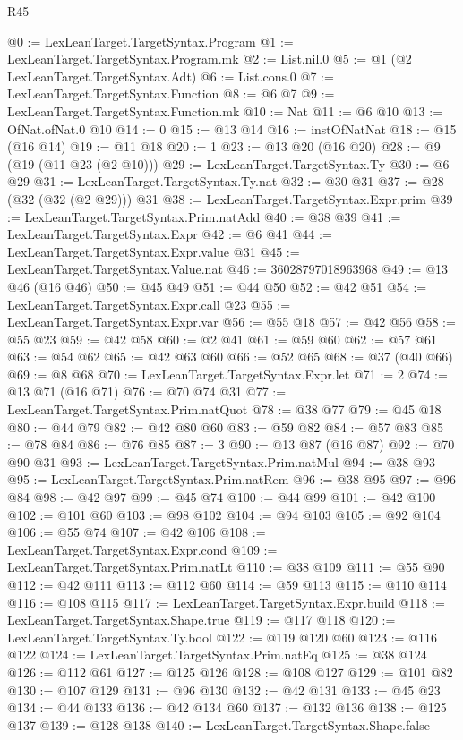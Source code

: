 \begin{lexlean}{R45}
\begin{coremodule}
@0 := LexLeanTarget.TargetSyntax.Program
@1 := LexLeanTarget.TargetSyntax.Program.mk
@2 := List.nil.{0}
@5 := @1 (@2 LexLeanTarget.TargetSyntax.Adt)
@6 := List.cons.{0}
@7 := LexLeanTarget.TargetSyntax.Function
@8 := @6 @7
@9 := LexLeanTarget.TargetSyntax.Function.mk
@10 := Nat
@11 := @6 @10
@13 := OfNat.ofNat.{0} @10
@14 := 0
@15 := @13 @14
@16 := instOfNatNat
@18 := @15 (@16 @14)
@19 := @11 @18
@20 := 1
@23 := @13 @20 (@16 @20)
@28 := @9 (@19 (@11 @23 (@2 @10)))
@29 := LexLeanTarget.TargetSyntax.Ty
@30 := @6 @29
@31 := LexLeanTarget.TargetSyntax.Ty.nat
@32 := @30 @31
@37 := @28 (@32 (@32 (@2 @29))) @31
@38 := LexLeanTarget.TargetSyntax.Expr.prim
@39 := LexLeanTarget.TargetSyntax.Prim.natAdd
@40 := @38 @39
@41 := LexLeanTarget.TargetSyntax.Expr
@42 := @6 @41
@44 := LexLeanTarget.TargetSyntax.Expr.value @31
@45 := LexLeanTarget.TargetSyntax.Value.nat
@46 := 36028797018963968
@49 := @13 @46 (@16 @46)
@50 := @45 @49
@51 := @44 @50
@52 := @42 @51
@54 := LexLeanTarget.TargetSyntax.Expr.call @23
@55 := LexLeanTarget.TargetSyntax.Expr.var
@56 := @55 @18
@57 := @42 @56
@58 := @55 @23
@59 := @42 @58
@60 := @2 @41
@61 := @59 @60
@62 := @57 @61
@63 := @54 @62
@65 := @42 @63 @60
@66 := @52 @65
@68 := @37 (@40 @66)
@69 := @8 @68
@70 := LexLeanTarget.TargetSyntax.Expr.let
@71 := 2
@74 := @13 @71 (@16 @71)
@76 := @70 @74 @31
@77 := LexLeanTarget.TargetSyntax.Prim.natQuot
@78 := @38 @77
@79 := @45 @18
@80 := @44 @79
@82 := @42 @80 @60
@83 := @59 @82
@84 := @57 @83
@85 := @78 @84
@86 := @76 @85
@87 := 3
@90 := @13 @87 (@16 @87)
@92 := @70 @90 @31
@93 := LexLeanTarget.TargetSyntax.Prim.natMul
@94 := @38 @93
@95 := LexLeanTarget.TargetSyntax.Prim.natRem
@96 := @38 @95
@97 := @96 @84
@98 := @42 @97
@99 := @45 @74
@100 := @44 @99
@101 := @42 @100
@102 := @101 @60
@103 := @98 @102
@104 := @94 @103
@105 := @92 @104
@106 := @55 @74
@107 := @42 @106
@108 := LexLeanTarget.TargetSyntax.Expr.cond
@109 := LexLeanTarget.TargetSyntax.Prim.natLt
@110 := @38 @109
@111 := @55 @90
@112 := @42 @111
@113 := @112 @60
@114 := @59 @113
@115 := @110 @114
@116 := @108 @115
@117 := LexLeanTarget.TargetSyntax.Expr.build
@118 := LexLeanTarget.TargetSyntax.Shape.true
@119 := @117 @118
@120 := LexLeanTarget.TargetSyntax.Ty.bool
@122 := @119 @120 @60
@123 := @116 @122
@124 := LexLeanTarget.TargetSyntax.Prim.natEq
@125 := @38 @124
@126 := @112 @61
@127 := @125 @126
@128 := @108 @127
@129 := @101 @82
@130 := @107 @129
@131 := @96 @130
@132 := @42 @131
@133 := @45 @23
@134 := @44 @133
@136 := @42 @134 @60
@137 := @132 @136
@138 := @125 @137
@139 := @128 @138
@140 := LexLeanTarget.TargetSyntax.Shape.false

\end{coremodule}
\end{lexlean}
